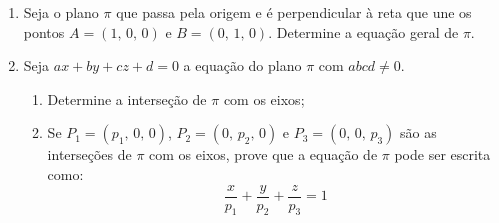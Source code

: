 \documentclass[12pt,a4paper]{article}
\begin{document}
\begin{enumerate}
 \item Seja o plano $\pi$ que passa pela origem e é perpendicular à reta que une os pontos
  $A = (1,\, 0,\, 0)$ e $B = (0,\, 1,\, 0)$. Determine a equação geral de $\pi$.
  
 \item Seja $ax + by + cz + d = 0$ a equação do plano $\pi$ com $abcd \neq 0$.
 \begin{enumerate}
  \item Determine a interseção de $\pi$ com os eixos;
  \item Se $P_1 = (p_1,\,0,\,0)$, $P_2 = (0,\,p_2,\,0)$ e $P_3 = (0,\,0,\,p_3)$ são as interseções de $\pi$ com
  os eixos, prove que a equação de $\pi$ pode ser escrita como:
  $$\frac{x}{p_1} + \frac{y}{p_2} + \frac{z}{p_3} = 1$$
 \end{enumerate}
 
\end{enumerate}
\end{document}
